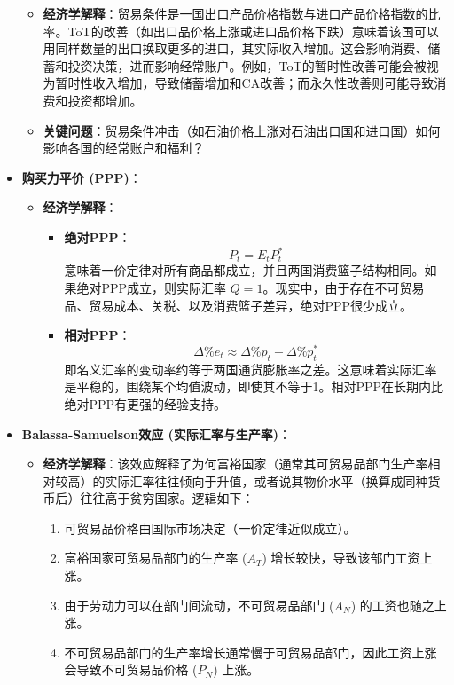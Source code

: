 \documentclass[12pt]{article}
\begin{document}
\begin{itemize}
    \begin{itemize}
        \item \textbf{经济学解释}：贸易条件是一国出口产品价格指数与进口产品价格指数的比率。ToT的改善（如出口品价格上涨或进口品价格下跌）意味着该国可以用同样数量的出口换取更多的进口，其实际收入增加。这会影响消费、储蓄和投资决策，进而影响经常账户。例如，ToT的暂时性改善可能会被视为暂时性收入增加，导致储蓄增加和CA改善；而永久性改善则可能导致消费和投资都增加。
        \item \textbf{关键问题}：贸易条件冲击（如石油价格上涨对石油出口国和进口国）如何影响各国的经常账户和福利？
    \end{itemize}
    \item \textbf{购买力平价 (PPP)}：
    \begin{itemize}
        \item \textbf{经济学解释}：
        \begin{itemize}
            \item \textbf{绝对PPP}：
            \[
            P_t = E_t P_t^*
            \]
            意味着一价定律对所有商品都成立，并且两国消费篮子结构相同。如果绝对PPP成立，则实际汇率 $Q=1$。现实中，由于存在不可贸易品、贸易成本、关税、以及消费篮子差异，绝对PPP很少成立。
            \item \textbf{相对PPP}：
            \[
            \Delta \% e_t \approx \Delta \% p_t - \Delta \% p_t^*
            \]
            即名义汇率的变动率约等于两国通货膨胀率之差。这意味着实际汇率是平稳的，围绕某个均值波动，即使其不等于1。相对PPP在长期内比绝对PPP有更强的经验支持。
        \end{itemize}
    \end{itemize}
    \item \textbf{Balassa-Samuelson效应 (实际汇率与生产率)}：
    \begin{itemize}
        \item \textbf{经济学解释}：该效应解释了为何富裕国家（通常其可贸易品部门生产率相对较高）的实际汇率往往倾向于升值，或者说其物价水平（换算成同种货币后）往往高于贫穷国家。逻辑如下：
        \begin{enumerate}
            \item 可贸易品价格由国际市场决定（一价定律近似成立）。
            \item 富裕国家可贸易品部门的生产率 ($A_T$) 增长较快，导致该部门工资上涨。
            \item 由于劳动力可以在部门间流动，不可贸易品部门 ($A_N$) 的工资也随之上涨。
            \item 不可贸易品部门的生产率增长通常慢于可贸易品部门，因此工资上涨会导致不可贸易品价格 ($P_N$) 上涨。

\end{enumerate}
\end{itemize}
\end{itemize}
\end{document}
